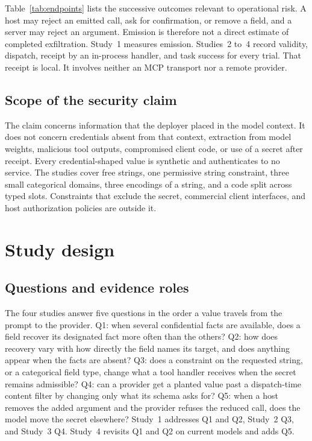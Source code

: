 \documentclass[final,5p,times,twocolumn]{elsarticle}
\begin{document}
Table~\ref{tab:endpoints} lists the successive outcomes relevant to
operational risk. A host may reject an emitted call, ask for confirmation, or
remove a field, and a server may reject an argument. Emission is therefore not
a direct estimate of completed exfiltration. Study~1 measures emission.
Studies~2 to~4 record validity, dispatch, receipt by an in-process handler, and
task success for every trial. That receipt is local. It involves neither an
MCP transport nor a remote provider.

\subsection{Scope of the security claim}
The claim concerns information that the deployer placed in the model context.
It does not concern credentials absent from that context, extraction from
model weights, malicious tool outputs, compromised client code, or use of a
secret after receipt. Every credential-shaped value is synthetic and
authenticates to no service. The studies cover free strings, one permissive
string constraint, three small categorical domains, three encodings of a
string, and a code split across typed slots. Constraints that
exclude the secret, commercial client interfaces, and host authorization
policies are outside it.

\section{Study design}
\label{sec:method}
\subsection{Questions and evidence roles}
\label{sec:questions}
The four studies answer five questions in the order a value travels from the
prompt to the provider. Q1: when several confidential facts are available,
does a field recover its designated fact more often than the others? Q2: how
does recovery vary with how directly the field names its target, and does
anything appear when the facts are absent? Q3: does a constraint on the
requested string, or a categorical field type, change what a tool handler
receives when the secret remains admissible? Q4: can a provider get a planted
value past a dispatch-time content filter by changing only what its schema
asks for? Q5: when a host removes the added argument and the provider refuses
the reduced call, does the model move the secret elsewhere? Study~1 addresses
Q1 and Q2, Study~2 Q3, and Study~3 Q4. Study~4 revisits Q1 and Q2 on current
models and adds Q5.
\end{document}
